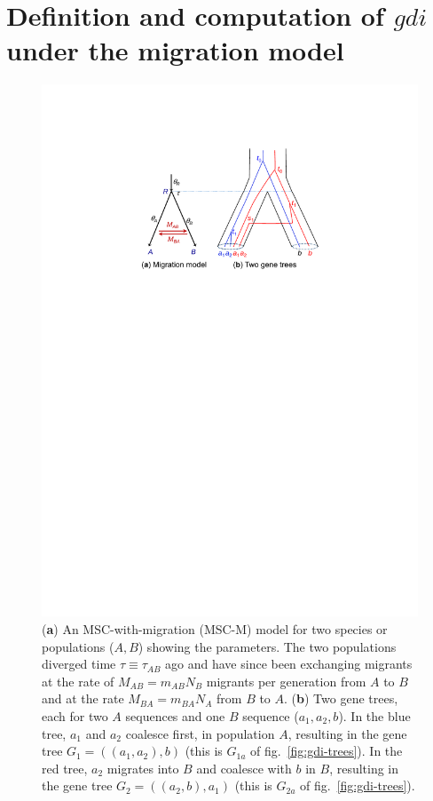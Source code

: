 \documentclass{article1}
\begin{document}
\section{Definition and computation of $gdi$ under the migration model}

\begin{figure} [t]
   \centering %
   \includegraphics[scale=0.6]{figs/fig-tree-mscm} %
   
   \caption{(\textbf{a}) An MSC-with-migration (MSC-M) model for two species or
   populations ($A,B$) showing the parameters.  The two populations diverged time $\tau
   \equiv \tau_{AB}$ ago and have since been exchanging migrants at the rate of $M_{AB} =
   m_{AB}N_B$ migrants per generation from $A$ to $B$ and at the rate $M_{BA} = m_{BA}N_A$
   from $B$ to $A$.  (\textbf{b}) Two gene trees, each for two $A$ sequences and one $B$
   sequence ($a_1, a_2, b$).  In the blue tree, $a_1$ and $a_2$ coalesce first, in
   population $A$, resulting in the gene tree $G_1 = ((a_1,a_2),b)$ (this is $G_{1a}$ of
   fig.~\ref{fig:gdi-trees}).  In the red tree, $a_2$ migrates into $B$ and coalesce with
   $b$ in $B$, resulting in the gene tree $G_2 = ((a_2,b),a_1)$ (this is $G_{2a}$ of
   fig.~\ref{fig:gdi-trees}). %
} \label{fig:tree-mscm}
\vspace{-0.5cm}
\end{figure}
\end{document}
